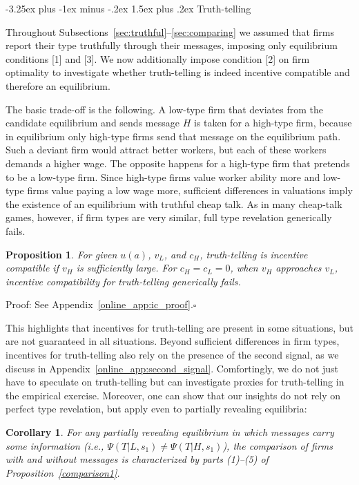 \documentclass[12pt]{article}
\makeatletter
\renewcommand{\subsection}{%
  \@startsection{subsection}{2}{\z@}%
  {-3.25ex plus -1ex minus -.2ex}%
  {1.5ex plus .2ex}%
  {\normalfont\large\bfseries}%
}
\newtheorem{corollary}[theorem]{Corollary}
\newtheorem{prop}{Proposition}
\makeatother
\begin{document}
\subsection{Truth-telling}\label{sec:truth-telling}

Throughout Subsections~\ref{sec:truthful}--\ref{sec:comparing} we assumed that firms report their type truthfully through their messages, imposing only equilibrium conditions [1] and [3]. We now additionally impose condition [2] on firm optimality to investigate whether truth-telling is indeed incentive compatible and therefore an equilibrium.

The basic trade-off is the following. A low-type firm that deviates from the candidate equilibrium and sends message $H$ is taken for a high-type firm, because in equilibrium only high-type firms send that message on the equilibrium path. Such a deviant firm would attract better workers, but each of these workers demands a higher wage. The opposite happens for a high-type firm that pretends to be a low-type firm. Since high-type firms value worker ability more and low-type firms value paying a low wage more, sufficient differences in valuations imply the existence of an equilibrium with truthful cheap talk. As in many cheap-talk games, however, if firm types are very similar, full type revelation generically fails.

\begin{prop}
\label{prop:incentive_compat} For given $u(a)$, $v_{L}$, and $c_{H}$, truth-telling is incentive compatible if $v_{H}$ is sufficiently large. For $c_{H}=c_{L}=0$, when $v_{H}$ approaches $v_{L}$, incentive compatibility for truth-telling generically fails.
\end{prop}

\noindent Proof: See Appendix~\ref{online_app:ic_proof}.$\square$\bigskip

This highlights that incentives for truth-telling are present in some situations, but are not guaranteed in all situations. Beyond sufficient differences in firm types, incentives for truth-telling also rely on the presence of the second signal, as we discuss in Appendix~\ref{online_app:second_signal}. Comfortingly, we do not just have to speculate on truth-telling but can investigate proxies for truth-telling in the empirical exercise. Moreover, one can show that our insights do not rely on perfect type revelation, but apply even to partially revealing equilibria:

\begin{corollary}
\label{cor:partially_revealing}For any partially revealing equilibrium in which messages carry some information (i.e., $\Psi(T|L,s_{1}) \neq \Psi(T|H,s_{1})$), the comparison of firms with and without messages is characterized by parts (1)--(5) of Proposition~\ref{comparison1}.
\end{corollary}
\end{document}
